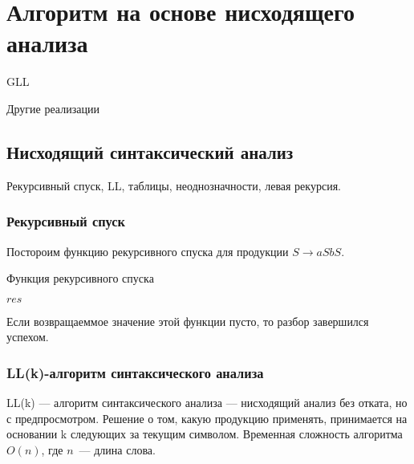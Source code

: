 \chapter{Алгоритм на основе нисходящего анализа}

GLL~\cite{Grigorev:2017:CPQ:3166094.3166104}

Другие реализации~\cite{MEDEIROS201975}

\section{Нисходящий синтаксический анализ}

Рекурсивный спуск, LL, таблицы, неоднозначности, левая рекурсия.

\subsection{Рекурсивный спуск}

\begin{example}
Постороим функцию рекурсивного спуска для продукции $S \rightarrow aSbS$.

\begin{algorithm}
\begin{algorithmic}[1]
\caption{Функция рекурсивного спуска}
    
    \EndIf
      
    \EndIf
    
    \State \Return $res$
\EndFunction

\end{algorithmic}
\end{algorithm}
\end{example}

Если возвращаеммое значение этой функции пусто, то разбор завершился успехом.

\subsection{LL(k)-алгоритм синтаксического анализа}

LL(k) --- алгоритм синтаксического анализа --- нисходящий анализ без отката, но с предпросмотром. 
Решение о том, какую продукцию применять, принимается на основании k следующих за текущим символом. 
Временная сложность алгоритма $O(n)$, где $n$~--- длина слова. 

